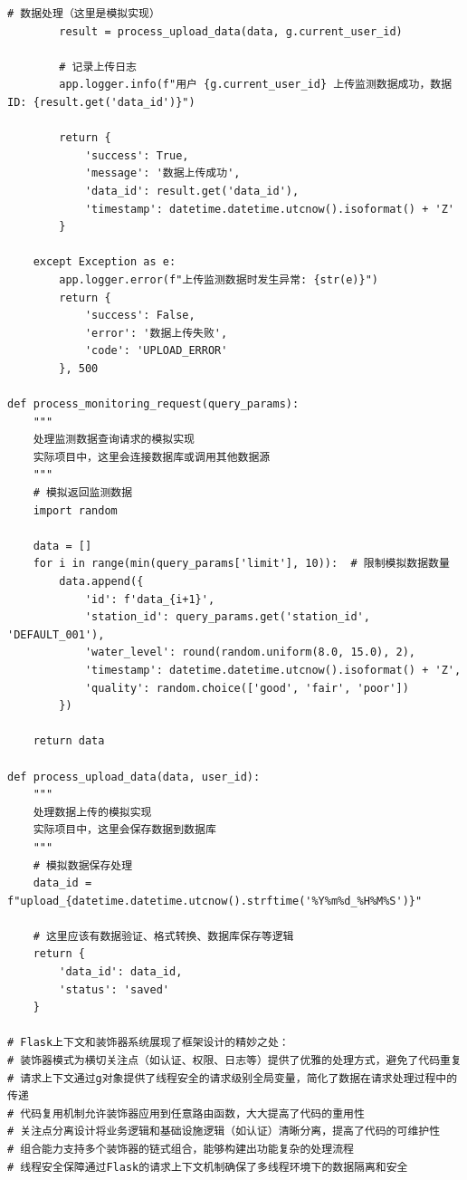\begin{lstlisting}[style=python]
        # 数据处理（这里是模拟实现）
        result = process_upload_data(data, g.current_user_id)
        
        # 记录上传日志
        app.logger.info(f"用户 {g.current_user_id} 上传监测数据成功，数据ID: {result.get('data_id')}")
        
        return {
            'success': True,
            'message': '数据上传成功',
            'data_id': result.get('data_id'),
            'timestamp': datetime.datetime.utcnow().isoformat() + 'Z'
        }
        
    except Exception as e:
        app.logger.error(f"上传监测数据时发生异常: {str(e)}")
        return {
            'success': False,
            'error': '数据上传失败',
            'code': 'UPLOAD_ERROR'
        }, 500

def process_monitoring_request(query_params):
    """
    处理监测数据查询请求的模拟实现
    实际项目中，这里会连接数据库或调用其他数据源
    """
    # 模拟返回监测数据
    import random
    
    data = []
    for i in range(min(query_params['limit'], 10)):  # 限制模拟数据数量
        data.append({
            'id': f'data_{i+1}',
            'station_id': query_params.get('station_id', 'DEFAULT_001'),
            'water_level': round(random.uniform(8.0, 15.0), 2),
            'timestamp': datetime.datetime.utcnow().isoformat() + 'Z',
            'quality': random.choice(['good', 'fair', 'poor'])
        })
    
    return data

def process_upload_data(data, user_id):
    """
    处理数据上传的模拟实现
    实际项目中，这里会保存数据到数据库
    """
    # 模拟数据保存处理
    data_id = f"upload_{datetime.datetime.utcnow().strftime('%Y%m%d_%H%M%S')}"
    
    # 这里应该有数据验证、格式转换、数据库保存等逻辑
    return {
        'data_id': data_id,
        'status': 'saved'
    }

# Flask上下文和装饰器系统展现了框架设计的精妙之处：
# 装饰器模式为横切关注点（如认证、权限、日志等）提供了优雅的处理方式，避免了代码重复
# 请求上下文通过g对象提供了线程安全的请求级别全局变量，简化了数据在请求处理过程中的传递
# 代码复用机制允许装饰器应用到任意路由函数，大大提高了代码的重用性
# 关注点分离设计将业务逻辑和基础设施逻辑（如认证）清晰分离，提高了代码的可维护性
# 组合能力支持多个装饰器的链式组合，能够构建出功能复杂的处理流程
# 线程安全保障通过Flask的请求上下文机制确保了多线程环境下的数据隔离和安全
\end{lstlisting}

